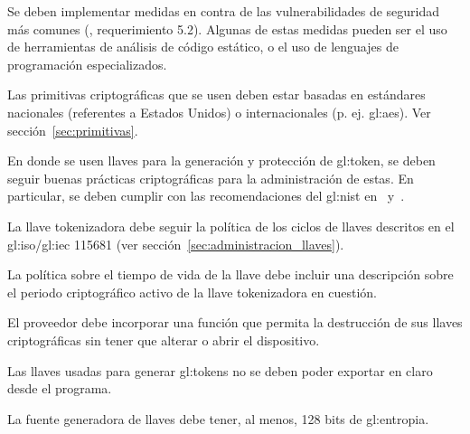 {
  Se deben implementar medidas en contra de las vulnerabilidades de
  seguridad más comunes (\cite{dss_pa}, requerimiento 5.2). Algunas de estas
  medidas pueden ser el uso de herramientas de análisis de código estático,
  o el uso de lenguajes de programación especializados.
}

{
  Las primitivas criptográficas que se usen deben estar basadas en
  estándares nacionales (referentes a Estados Unidos) o internacionales (p. ej.
  \gls{gl:aes}). Ver sección~\ref{sec:primitivas}.
}



{
  En donde se usen llaves para la generación y protección de \gls{gl:token},
  se deben seguir buenas prácticas criptográficas para la administración de
  estas. En particular, se deben cumplir con las recomendaciones del
  \gls{gl:nist} en~\cite{nist_llaves} y~\cite{nist_disenio_llaves}.
}

{
  La llave tokenizadora debe seguir la política de los ciclos de llaves
  descritos en el \acrshort{gl:iso}/\acrshort{gl:iec} 115681 (ver
  sección~\ref{sec:administracion_llaves}).
}

{
  La política sobre el tiempo de vida de la llave debe incluir una
  descripción sobre el periodo criptográfico activo de la llave
  tokenizadora en cuestión.
}

{
  El proveedor debe incorporar una función que permita la destrucción
  de sus llaves criptográficas sin tener que alterar o abrir el
  dispositivo.
}

{
  Las llaves usadas para generar \glspl{gl:token} no se deben poder
  exportar en claro desde el programa.
}

{
  La fuente generadora de llaves debe tener, al menos, 128 bits de
  \gls{gl:entropia}.
}

